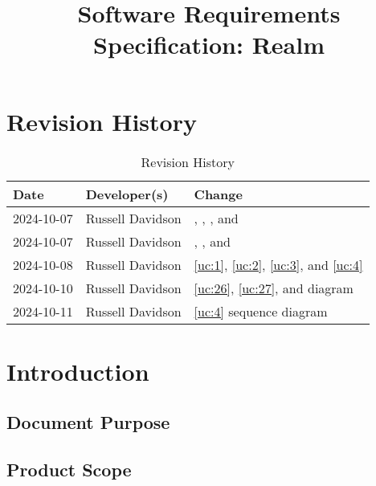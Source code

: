 \documentclass{article}
\title{Software Requirements Specification: Realm\\\progname}
\author{\authname}
\date{}
\begin{document}
\maketitle

\newpage{}

\tableofcontents

\section*{Revision History}

\begin{table}[hp]
\caption{Revision History} \label{TblRevisionHistory}
\begin{tabularx}{\textwidth}{llX}
\toprule
\textbf{Date} & \textbf{Developer(s)} & \textbf{Change}\\
\midrule
2024-10-07 & Russell Davidson & \nameref{sub:compliance}, \nameref{ssub:installation}, \nameref{ssub:distribution}, and \nameref{ssub:portability} \\
2024-10-07 & Russell Davidson & \nameref{ssub:tutorial}, \nameref{ssub:tour_management}, and \nameref{ssub:touring} \\
2024-10-08 & Russell Davidson & \ref{uc:1}, \ref{uc:2}, \ref{uc:3}, and \ref{uc:4} \\
2024-10-10 & Russell Davidson & \ref{uc:26}, \ref{uc:27}, and \nameref{sub:use_cases} diagram\\
2024-10-11 & Russell Davidson & \ref{uc:4} sequence diagram\\
\bottomrule
\end{tabularx}
\end{table}

\section{Introduction}

\subsection{Document Purpose}


\subsection{Product Scope}
\end{document}
